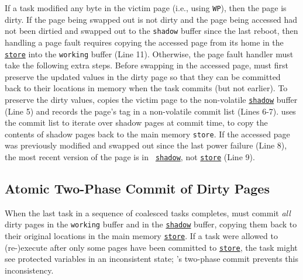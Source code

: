 If a task modified any byte in the victim page (i.e., using \texttt{WP}), then
the page is dirty.  If the page being swapped out is not dirty and the page
being accessed had not been dirtied and swapped out to the \texttt{shadow}
buffer since the last reboot, then handling a page fault requires copying the
accessed page from its home in the  \texttt{\underline{store}} into the
\texttt{working} buffer (Line 11).  Otherwise, the page fault handler must take
the following extra steps.
%
Before swapping in the accessed page, \sys must first preserve the updated
values in the dirty page so that they can be committed back to their locations
in memory when the task commits (but not earlier).  To preserve the dirty
values, \sys copies the victim page to the non-volatile
\texttt{\underline{shadow}} buffer (Line 5) and records the page's tag in a
non-volatile commit list (Lines 6-7). \sys uses the commit list to iterate over shadow pages 
at commit time, to copy the contents of shadow pages back to the main memory {\tt store}. 
%
%
If the accessed page was previously modified and swapped out since the last
power failure (Line 8), the most recent version of the page is in {\tt
\underline{shadow}}, not \texttt{\underline{store}} (Line 9).




%

\subsection{Atomic Two-Phase Commit of Dirty Pages}

When the last task in a sequence of coalesced tasks completes, \sys must commit
\emph{all} dirty pages in the \texttt{working} buffer and in the
\texttt{\underline{shadow}} buffer, copying them back to their original
locations in the main memory \texttt{\underline{store}}. If a task were allowed
to (re-)execute after only some pages have been committed to
\texttt{\underline{store}}, the task might see protected variables in an
inconsistent state; \sys's two-phase commit prevents this inconsistency.

